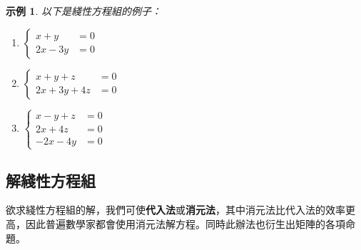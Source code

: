 \documentclass[12pt]{article}
\newtheorem*{example}{示例}
\begin{document}
    \begin{example}
        以下是綫性方程組的例子：
        \begin{enumerate}
            \item $\begin{cases}
                x+y&=0\\
                2x-3y&=0
            \end{cases}$
            \item $\begin{cases}
                x+y+z&=0\\
                2x+3y+4z&=0
            \end{cases}$
            \item $\begin{cases}
                x-y+z&=0\\
                2x+4z&=0\\
                -2x-4y&=0
            \end{cases}$
        \end{enumerate}
    \end{example}

    \subsection*{解綫性方程組}

    欲求綫性方程組的解，我們可使\textbf{代入法}或\textbf{消元法}，其中消元法比代入法的效率更高，因此普遍數學家都會使用消元法解方程。同時此辦法也衍生出矩陣的各項命題。
\end{document}
